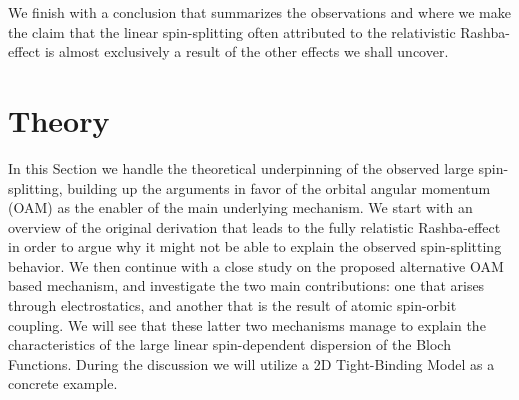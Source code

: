 We finish with a conclusion that summarizes the observations and where we make the claim that the linear spin-splitting often attributed to the relativistic Rashba-effect is almost exclusively a result of the other effects we shall uncover.

\section{Theory \label{sec:Rashba_Theory}}
In this Section we handle the theoretical underpinning of the observed large spin-splitting, building up the arguments in favor of the orbital angular momentum (OAM) as the enabler of the main underlying mechanism.
We start with an overview of the original derivation that leads to the fully relatistic Rashba-effect in order to argue why it might not be able to explain the observed spin-splitting behavior.
We then continue with a close study on the proposed alternative OAM based mechanism, and investigate the two main contributions: one that arises through electrostatics, and another that is the result of atomic spin-orbit coupling.
We will see that these latter two mechanisms manage to explain the characteristics of the large linear spin-dependent dispersion of the Bloch Functions.
During the discussion we will utilize a 2D Tight-Binding Model as a concrete example.

